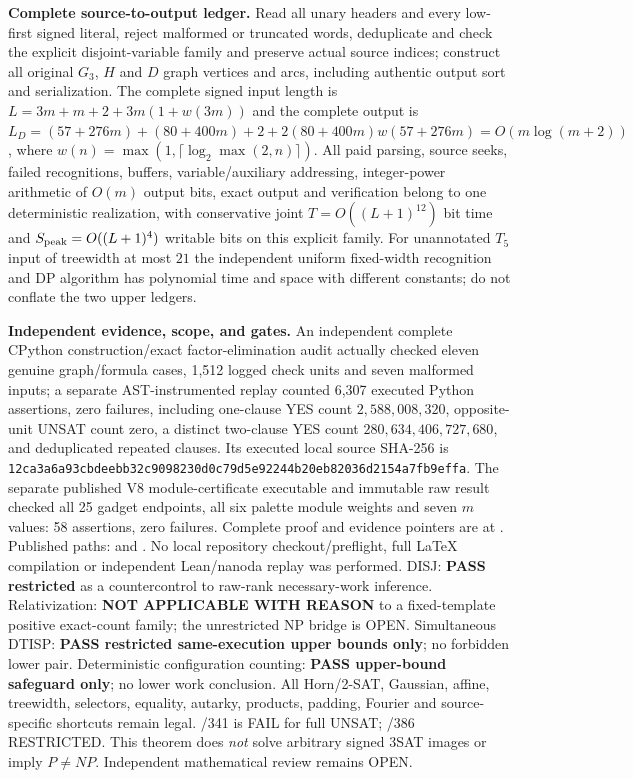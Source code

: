 \documentclass[11pt]{article}
\begin{document}
\noindent\textbf{Complete source-to-output ledger.}
Read all unary headers and every low-first signed literal, reject
malformed or truncated words, deduplicate and check the explicit
disjoint-variable family and preserve actual source indices;
construct all original $G_3$, $H$ and $D$ graph vertices and arcs,
including authentic output sort and serialization.
The complete signed input length is
$L=3m+m+2+3m(1+w(3m))$ and the complete output is
$L_D=(57+276m)+(80+400m)+2+
 2(80+400m)w(57+276m)=O(m\log(m+2))$,
where $w(n)=\max(1,\lceil\log_2\max(2,n)\rceil)$.
All paid parsing, source seeks, failed recognitions, buffers,
variable/auxiliary addressing, integer-power arithmetic of $O(m)$
output bits, exact output and verification belong to one
deterministic realization, with conservative joint
$T=O((L+1)^{12})$ bit time and
$S_{\rm peak}=O((L+1)^4)$ writable bits on this explicit family.
For unannotated $T_5$ input of treewidth at most $21$ the
independent uniform fixed-width recognition and DP algorithm
has polynomial time and space with different constants;
do not conflate the two upper ledgers.

\noindent\textbf{Independent evidence, scope, and gates.}
An independent complete CPython construction/exact factor-elimination
audit actually checked eleven genuine graph/formula cases,
1,512 logged check units and seven malformed inputs; a separate AST-instrumented replay counted 6,307 executed Python assertions, zero failures, including
one-clause YES count $2{,}588{,}008{,}320$, opposite-unit
UNSAT count zero, a distinct two-clause YES count
$280{,}634{,}406{,}727{,}680$, and deduplicated repeated clauses.
Its executed local source SHA-256 is
\texttt{12ca3a6a93cbdeebb32c9098230d0c79d5e92244b20eb82036d2154a7fb9effa}.
The separate published V8 module-certificate executable and
immutable raw result checked all 25 gadget endpoints, all six
palette module weights and seven $m$ values: 58 assertions,
zero failures. Complete proof and evidence pointers are at
.
Published paths:
 and
.
No local repository checkout/preflight, full LaTeX compilation
or independent Lean/nanoda replay was performed.
DISJ: \textbf{PASS restricted} as a countercontrol to raw-rank
necessary-work inference. Relativization: \textbf{NOT APPLICABLE
WITH REASON} to a fixed-template positive exact-count family;
the unrestricted NP bridge is OPEN. Simultaneous DTISP:
\textbf{PASS restricted same-execution upper bounds only};
no forbidden lower pair. Deterministic configuration counting:
\textbf{PASS upper-bound safeguard only}; no lower work conclusion.
All Horn/2-SAT, Gaussian, affine, treewidth, selectors, equality,
autarky, products, padding, Fourier and source-specific shortcuts
remain legal. /341 is FAIL for full UNSAT; /386 RESTRICTED.
This theorem does \emph{not} solve arbitrary signed 3SAT images
or imply $P\ne NP$. Independent mathematical review remains OPEN.
\end{document}
